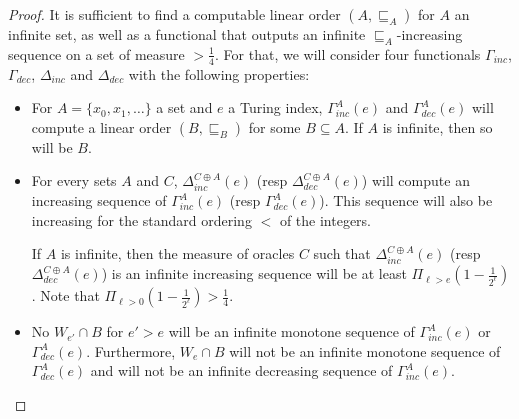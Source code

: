 \documentclass{article}
\numberwithin{theorem}{section}
\newcommand{\ludovic}[1]{\textcolor{blue}{#1}}
\newcommand{\quentin}[1]{\textcolor{green}{#1}}
\begin{document}
\begin{proof}
It is sufficient to find a computable linear order $(A, \sqsubseteq_A)$ for $A$ an infinite set, as well as a functional that outputs an infinite $\sqsubseteq_A$-increasing sequence on a set of measure $> \frac{1}{4}$.
For that, we will consider four functionals $\Gamma_{inc}$, $\Gamma_{dec}$, $\Delta_{inc}$ and $\Delta_{dec}$ with the following properties:
\begin{itemize}
    \item For $A = \{x_0, x_1, \dots \}$ a set and $e$ a Turing index, $\Gamma^A_{inc}(e)$ and $\Gamma^A_{dec}(e)$ will compute a linear order $(B,\sqsubseteq_B)$ for some $B \subseteq A$. If $A$ is infinite, then so will be $B$.
    
    \item For every sets $A$ and $C$, $\Delta^{C\oplus A}_{inc}(e)$ (resp $\Delta^{C\oplus A}_{dec}(e)$) will compute an increasing sequence of $\Gamma^A_{inc}(e)$ (resp $\Gamma^A_{dec}(e)$). This sequence will also be increasing for the standard ordering $<$ of the integers.
 
    If $A$ is infinite, then the measure of oracles $C$ such that $\Delta^{C\oplus A}_{inc}(e)$ (resp $\Delta^{C\oplus A}_{dec}(e)$) is an infinite increasing sequence will be at least $\Pi_{\ell > e} (1 - \frac{1}{2^{\ell}})$. Note that $\Pi_{\ell > 0} (1 - \frac{1}{2^{\ell}}) > \frac{1}{4}$.
    
    \item No $W_{e'} \cap B$ for $e' > e$ will be an infinite monotone sequence of $\Gamma^A_{inc}(e)$ or $\Gamma^A_{dec}(e)$. Furthermore, $W_{e} \cap B$ will not be an infinite monotone
    sequence of $\Gamma^A_{dec}(e)$ and will not be an infinite decreasing sequence of $\Gamma^A_{inc}(e)$.
\end{itemize}


\end{proof}
\end{document}
